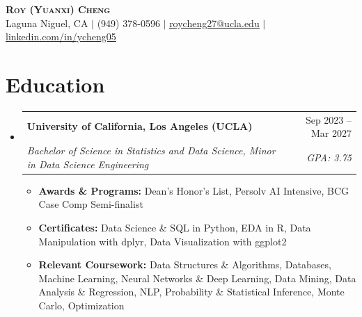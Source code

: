 \documentclass[letterpaper,11pt]{article}
\makeatletter
\newcommand{\resumeItem}[1]{
  \item\small{#1}
}
\newcommand{\resumeSubheading}[4]{
  \vspace{-2pt}\item
    \begin{tabular*}{\textwidth}[t]{l@{\extracolsep{\fill}}r}
      \textbf{#1} & #2 \\
      \textit{\small#3} & \textit{\small #4} \\
    \end{tabular*}\vspace{-7pt}
}
\newcommand{\resumeSubHeadingListStart}{\begin{itemize}[leftmargin=0in, label={}]}
\newcommand{\resumeSubHeadingListEnd}{\end{itemize}}
\newcommand{\resumeItemListStart}{\begin{itemize}[itemsep= 1.5pt, parsep=0pt]}
\newcommand{\resumeItemListEnd}{\end{itemize}\vspace{-5pt}}
\makeatother
\begin{document}
\begin{center}
    \textbf{\LARGE \scshape Roy (Yuanxi) Cheng} \\ \vspace{3pt}
    \small Laguna Niguel, CA $|$ (949) 378-0596 $|$
    \href{mailto:roycheng27@ucla.edu}{\underline{roycheng27@ucla.edu}} $|$
    \href{https://www.linkedin.com/in/ycheng05}{\underline{linkedin.com/in/ycheng05}}
\end{center}
\section{Education}
  \resumeSubHeadingListStart
    \resumeSubheading
      {University of California, Los Angeles (UCLA)}{Sep 2023 -- Mar 2027}
      {Bachelor of Science in Statistics and Data Science, Minor in Data Science Engineering}{GPA: 3.75}
      \resumeItemListStart
        \resumeItem{\textbf{Awards \& Programs:} Dean's Honor's List, Persolv AI Intensive, BCG Case Comp Semi-finalist}
        \resumeItem{\textbf{Certificates:} Data Science \& SQL in Python, EDA in R, Data Manipulation with dplyr, Data Visualization with ggplot2}
        \resumeItem{\textbf{Relevant Coursework:} Data Structures \& Algorithms, Databases, Machine Learning, Neural Networks \& Deep Learning, Data Mining, Data Analysis \& Regression, NLP, Probability \& Statistical Inference, Monte Carlo, Optimization}
      \resumeItemListEnd
  \resumeSubHeadingListEnd
\end{document}
